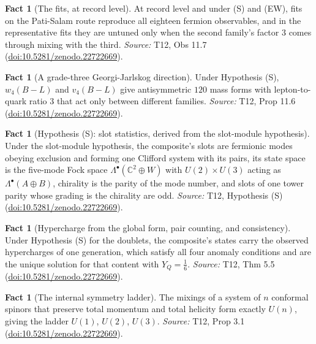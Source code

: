 \documentclass[11pt]{article}
\theoremstyle{definition}
\newtheorem{fact}[theorem]{Fact}
\theoremstyle{plain}
\providecommand{\C}{}\renewcommand{\C}{\mathbb{C}}
\begin{document}
\begin{fact}[The fits, at record level]\label{c:standard-model.fits-record-level}
At record level and under (S) and (EW), fits on the Pati-Salam route reproduce all eighteen fermion observables, and in the representative fits they are untuned only when the second family's factor $3$ comes through mixing with the third.
\emph{Source:} T12, Obs 11.7 (\href{https://doi.org/10.5281/zenodo.22722669}{doi:10.5281/zenodo.22722669}).
\end{fact}

\begin{fact}[A grade-three Georgi-Jarlskog direction]\label{c:standard-model.grade-three-georgi-jarlskog-direction}
Under Hypothesis (S), $w_{4}(B - L)$ and $v_{4}(B - L)$ give antisymmetric $120$ mass forms with lepton-to-quark ratio $3$ that act only between different families.
\emph{Source:} T12, Prop 11.6 (\href{https://doi.org/10.5281/zenodo.22722669}{doi:10.5281/zenodo.22722669}).
\end{fact}

\begin{fact}[Hypothesis (S): slot statistics, derived from the slot-module hypothesis]\label{c:standard-model.hyp-s-slot-statistics}
Under the slot-module hypothesis, the composite's slots are fermionic modes obeying exclusion and forming one Clifford system with its pairs, its state space is the five-mode Fock space $\Lambda^{\bullet}(\C^{2} \oplus W)$ with $U(2) \times U(3)$ acting as $\Lambda^{\bullet}(A \oplus B)$, chirality is the parity of the mode number, and slots of one tower parity whose grading is the chirality are odd.
\emph{Source:} T12, Hypothesis (S) (\href{https://doi.org/10.5281/zenodo.22722669}{doi:10.5281/zenodo.22722669}).
\end{fact}

\begin{fact}[Hypercharge from the global form, pair counting, and consistency]\label{c:standard-model.hypercharge-global-form-pair-counting-consistency}
Under Hypothesis (S) for the doublets, the composite's states carry the observed hypercharges of one generation, which satisfy all four anomaly conditions and are the unique solution for that content with $Y_{Q} = \tfrac16$.
\emph{Source:} T12, Thm 5.5 (\href{https://doi.org/10.5281/zenodo.22722669}{doi:10.5281/zenodo.22722669}).
\end{fact}

\begin{fact}[The internal symmetry ladder]\label{c:standard-model.internal-symmetry-ladder}
The mixings of a system of $n$ conformal spinors that preserve total momentum and total helicity form exactly $U(n)$, giving the ladder $U(1)$, $U(2)$, $U(3)$.
\emph{Source:} T12, Prop 3.1 (\href{https://doi.org/10.5281/zenodo.22722669}{doi:10.5281/zenodo.22722669}).
\end{fact}
\end{document}
